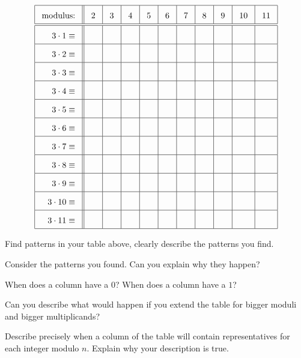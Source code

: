 \[
{\renewcommand{\arraystretch}{1.8}
\renewcommand{\arraycolsep}{3mm}
\begin{array}{|r||c|c|c|c|c|c|c|c|c|c|}\hline
\text{modulus:} & 2 & 3 & 4 & 5 & 6 & 7 & 8 & 9 & 10 & 11 \\ \hline\hline
3\cdot 1 \equiv & & & & & & & & & & \\ \hline
3\cdot 2 \equiv & & & & & & & & & & \\ \hline
3\cdot 3 \equiv & & & & & & & & & & \\ \hline
3\cdot 4 \equiv & & & & & & & & & & \\ \hline
3\cdot 5 \equiv & & & & & & & & & & \\ \hline
3\cdot 6 \equiv & & & & & & & & & & \\ \hline
3\cdot 7 \equiv & & & & & & & & & & \\ \hline
3\cdot 8 \equiv & & & & & & & & & & \\ \hline
3\cdot 9 \equiv & & & & & & & & & & \\ \hline
3\cdot 10\equiv & & & & & & & & & & \\ \hline
3\cdot 11\equiv & & & & & & & & & & \\ \hline
\end{array}}
\]

\begin{prob} 
Find patterns in your table above, clearly describe the patterns you find.
\end{prob}

\begin{prob} 
Consider the patterns you found. Can you explain why they happen?
\end{prob}


\begin{prob}
When does a column have a $0$? When does a column have a $1$? 
\end{prob}


\begin{prob}
Can you describe what would happen if you extend the table for bigger
moduli and bigger multiplicands?
\end{prob}

\begin{prob}
Describe precisely when a column of the table will contain
representatives for each integer modulo $n$. Explain why your
description is true.
\end{prob}

